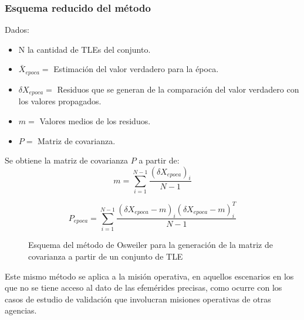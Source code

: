 \subsubsection*{Esquema reducido del m\'etodo}

Dados:
\begin{itemize}
\itemsep0em
 \item N la cantidad de TLEs del conjunto.
 \item $\bar{X}_{epoca} = $  Estimaci\'on del valor verdadero para la \'epoca.
 \item $\delta X_{epoca} = $ Residuos que se generan de la comparaci\'on del valor verdadero con los valores propagados.
 \item $m = $ Valores medios de los residuos.
 \item $P = $ Matriz de covarianza.
\end{itemize}

Se obtiene la matriz de covarianza $P$ a partir de:\\

\begin{equation}
 m=\sum_{i=1}^{N-1} \frac{(\delta X_{epoca})_{i}}{N-1} 
\end{equation}

\begin{equation}
 P_{epoca}=\sum_{i=1}^{N-1} \frac{(\delta X_{epoca}-m)_{i}(\delta X_{epoca}-m)_{i}^{T}}{N-1}
\end{equation}

\begin{figure}[!h]
\centering
{}
\caption[M\'etodo de Osweiler, \citep{osweiler} para la generaci\'on de la matriz de covarianza]{Esquema del m\'etodo de Osweiler \citep{osweiler} para la generaci\'on de la matriz de covarianza a partir de un conjunto de TLE}
\label{fig:tleosw}
\end{figure}

Este mismo m\'etodo se aplica a la misi\'on operativa, en aquellos escenarios en los que no se tiene acceso al dato de las efem\'erides precisas, como ocurre con los casos de estudio de validaci\'on que involucran misiones operativas de otras agencias.\\

